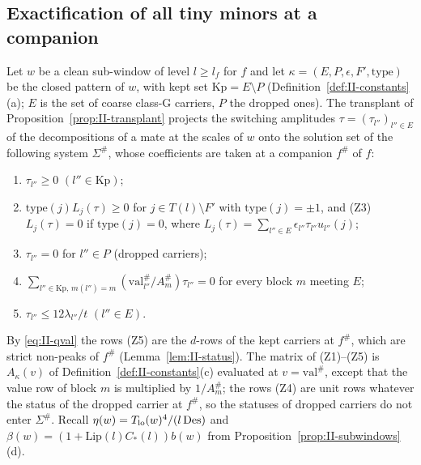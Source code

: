 \documentclass[10pt]{amsart}
\theoremstyle{definition}
\theoremstyle{remark}
\begin{document}
\subsection{Exactification of all tiny minors at a companion}\label{subsec:II-thmB}

Let $w$ be a clean sub-window of level $l\ge l_f$ for $f$ and let
$\kappa=(E,P,\epsilon,F',\mathrm{type})$ be the closed pattern of $w$, with
kept set $\mathrm{Kp}=E\setminus P$ (Definition~\ref{def:II-constants}(a);
$E$ is the set of coarse class-G carriers, $P$ the dropped ones).  The
transplant of Proposition~\ref{prop:II-transplant} projects the switching amplitudes
$\tau=(\tau_{l''})_{l''\in E}$ of the decompositions of a mate at the scales
of $w$ onto the solution set of the following system $\Sigma^\#$, whose
coefficients are taken at a companion $f^\#$ of $f$:
\begin{enumerate}
\item[(Z1)] $\tau_{l''}\ge0$ $(l''\in\mathrm{Kp})$;
\item[(Z2)] $\mathrm{type}(j)L_j(\tau)\ge0$ for $j\in T(l)\setminus F'$ with
$\mathrm{type}(j)=\pm1$, and (Z3) $L_j(\tau)=0$ if $\mathrm{type}(j)=0$, where
$L_j(\tau)=\sum_{l''\in E}\epsilon_{l''}\tau_{l''}u_{l''}(j)$;
\item[(Z4)] $\tau_{l''}=0$ for $l''\in P$ (dropped carriers);
\item[(Z5)] $\sum_{l''\in\mathrm{Kp},\,m(l'')=m}(\mathrm{val}^\#_{l''}/A^\#_m)
\tau_{l''}=0$ for every block $m$ meeting $E$;
\item[(box)] $\tau_{l''}\le12\lambda_{l''}/t$ $(l''\in E)$.
\end{enumerate}
By \eqref{eq:II-qval} the rows (Z5) are the $d$-rows of the kept carriers
at $f^\#$, which are strict non-peaks of $f^\#$ (Lemma~\ref{lem:II-status}).  The
matrix of (Z1)--(Z5) is $A_\kappa(v)$ of Definition~\ref{def:II-constants}(c)
evaluated at $v=\mathrm{val}^\#$, except that the value row of block $m$ is
multiplied by $1/A^\#_m$; the rows (Z4) are unit rows whatever the status of
the dropped carrier at $f^\#$, so the statuses of dropped carriers do not
enter $\Sigma^\#$.  Recall $\eta(w)=T_{\rm lo}(w)^4/(l\,\mathrm{Des})$ and
$\beta(w)=(1+\mathrm{Lip}(l)C_*(l))b(w)$ from
Proposition~\ref{prop:II-subwindows}(d).
\end{document}
